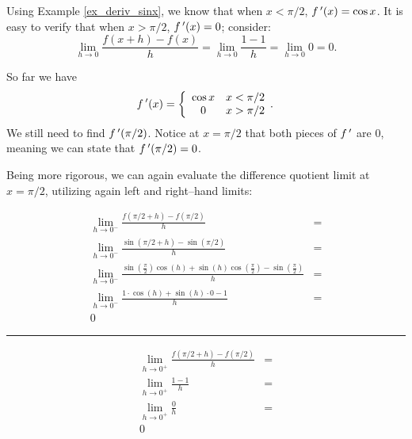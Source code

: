 {Using Example \ref{ex_deriv_sinx}, we know that when $x<\pi/2$, $f\,'(x) = \cos x$. It is easy to verify that when $x>\pi/2$, $f\,'(x) = 0$; consider:
			$$\lim_{h\to0}\frac{f(x+h) - f(x)}{h} = \lim_{h\to0}\frac{1-1}{h} = \lim_{h\to0}0 =0.$$
			
So far we have $$f\,'(x) = \left\{\begin{array}{cc} \cos x & x<\pi/2\\ 0 & x>\pi/2\end{array}.\right.$$ We still need to find $f\,'(\pi/2)$. Notice at $x=\pi/2$ that both pieces of $f\,'$ are 0, meaning we can state that $f\,'(\pi/2)=0$. 

Being more rigorous, we can again evaluate the difference quotient limit at $x=\pi/2$, utilizing again left and right--hand limits:\\

\small
\noindent\begin{minipage}{.6\linewidth}
\begin{align*}
\lim_{h\to0^-}\frac{f(\pi/2+h)-f(\pi/2)}{h} &=\\
\lim_{h\to0^-}\frac{\sin(\pi/2+h)-\sin(\pi/2)}{h}&=\\
\lim_{h\to0^-}{ \frac{\sin(\frac{\pi}{2})\cos(h)+\sin(h)\cos(\frac{\pi}{2})-\sin(\frac{\pi}{2})}{h}}&=\\
\lim_{h\to0^-}\frac{1\cdot\cos(h)+\sin(h)\cdot 0-1}{h} &=\\
0
\end{align*}
\end{minipage}
\begin{minipage}{1pt}
 \rule{.5pt}{100pt}
\end{minipage}
\begin{minipage}{.4\linewidth}
\begin{align*}
\lim_{h\to0^+}\frac{f(\pi/2+h)-f(\pi/2)}{h} &=\\
\lim_{h\to0^+}\frac{1-1}{h}&=\\
\lim_{h\to0^+}\frac{0}{h}&=\\
0&\\
\phantom{0}\\
\phantom{0}
\end{align*}
\end{minipage}
\normalsize

}
